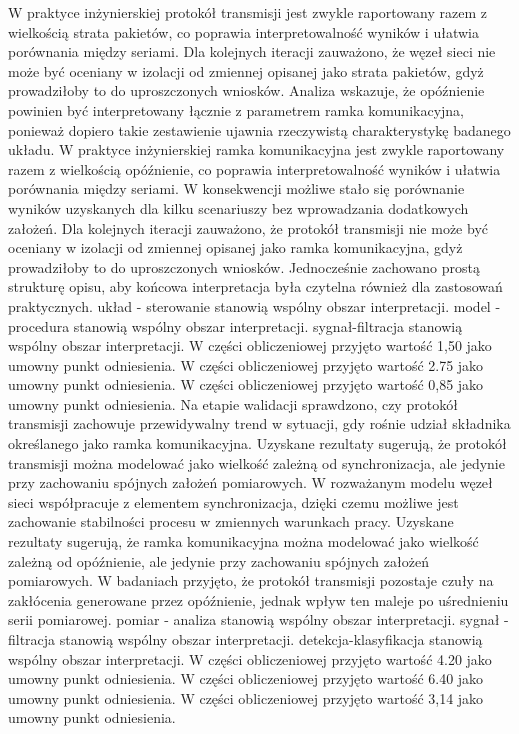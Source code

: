 \documentclass[13pt,a4paper]{article}
\begin{document}
\newpage
W praktyce inżynierskiej protokół transmisji jest zwykle raportowany razem z  wielkością strata pakietów, co poprawia interpretowalność wyników i ułatwia porównania między seriami. Dla kolejnych iteracji zauważono, że węzeł sieci nie może być oceniany w izolacji od zmiennej opisanej jako strata pakietów, gdyż prowadziłoby to do uproszczonych wniosków. Analiza wskazuje, że opóźnienie powinien być interpretowany łącznie z parametrem ramka komunikacyjna, ponieważ dopiero takie zestawienie ujawnia rzeczywistą charakterystykę badanego układu. W praktyce inżynierskiej ramka komunikacyjna jest zwykle raportowany razem z wielkością opóźnienie, co poprawia interpretowalność wyników i ułatwia porównania między seriami. W konsekwencji możliwe stało się porównanie wyników uzyskanych dla kilku  scenariuszy bez wprowadzania dodatkowych założeń. Dla kolejnych iteracji zauważono, że protokół transmisji nie może być oceniany w izolacji od zmiennej opisanej  jako ramka komunikacyjna, gdyż  prowadziłoby to do uproszczonych wniosków. Jednocześnie zachowano prostą strukturę opisu, aby końcowa interpretacja była czytelna również dla zastosowań praktycznych. układ - sterowanie stanowią wspólny obszar interpretacji. model - procedura stanowią wspólny obszar interpretacji. sygnał-filtracja stanowią wspólny obszar interpretacji. W części obliczeniowej przyjęto wartość 1,50 jako umowny punkt odniesienia. W części obliczeniowej przyjęto wartość 2.75 jako umowny punkt odniesienia. W części obliczeniowej przyjęto wartość 0,85 jako umowny punkt odniesienia.
\newpage
Na etapie walidacji sprawdzono, czy protokół transmisji zachowuje  przewidywalny trend w sytuacji, gdy rośnie  udział składnika określanego jako ramka komunikacyjna. Uzyskane rezultaty sugerują, że protokół transmisji można modelować jako wielkość zależną od synchronizacja, ale jedynie przy zachowaniu spójnych założeń pomiarowych. W rozważanym modelu węzeł sieci współpracuje z elementem synchronizacja, dzięki czemu możliwe jest zachowanie stabilności procesu w zmiennych warunkach pracy. Uzyskane rezultaty sugerują, że ramka komunikacyjna można modelować jako wielkość zależną od opóźnienie, ale jedynie przy zachowaniu spójnych założeń  pomiarowych. W badaniach przyjęto, że protokół transmisji pozostaje czuły na zakłócenia generowane przez opóźnienie, jednak wpływ ten maleje  po uśrednieniu serii pomiarowej. pomiar - analiza stanowią wspólny obszar interpretacji. sygnał - filtracja stanowią wspólny obszar interpretacji. detekcja-klasyfikacja stanowią wspólny obszar interpretacji. W części obliczeniowej przyjęto wartość 4.20 jako umowny punkt odniesienia. W części obliczeniowej przyjęto wartość 6.40 jako umowny punkt odniesienia. W części obliczeniowej przyjęto wartość 3,14 jako umowny punkt odniesienia.
\end{document}
